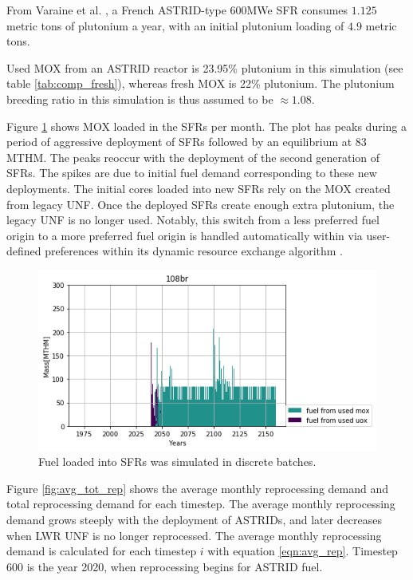 From Varaine et al. \cite{varaine_pre-conceptual_2012}, a French
ASTRID-type 600\gls{MWe} \gls{SFR} consumes $1.125$ metric tons of
plutonium a year, with an initial plutonium loading of $4.9$ metric tons.
 
Used \gls{MOX} from an ASTRID reactor is 23.95\% plutonium
in this simulation (see table \ref{tab:comp_fresh}), whereas fresh \gls{MOX} is 22\% plutonium.
The plutonium breeding ratio in this simulation is thus assumed to be
$\approx 1.08$.

Figure \ref{fig:fuel} shows \gls{MOX} loaded in the \glspl{SFR} per month.  The plot 
has peaks during a period of aggressive deployment of \glspl{SFR} followed by 
an equilibrium at 83 \gls{MTHM}. The peaks reoccur with the deployment of the 
second generation of \glspl{SFR}.  The spikes are due to initial fuel demand 
corresponding to these new deployments.  The initial cores loaded into new 
\glspl{SFR} rely on the \gls{MOX} created from legacy \gls{UNF}. Once the 
deployed \glspl{SFR} create enough extra plutonium, the legacy \gls{UNF} is no 
longer used. Notably, this switch from a less preferred fuel origin to a more 
preferred fuel origin is handled automatically within \Cyclus via user-defined preferences 
within its dynamic resource exchange algorithm \cite{gidden_methodology_2016}.


\begin{figure}[htbp!]
	\begin{center}
		\includegraphics[width=1.0\textwidth]{./images/french-transition/where_fuel.png}
	\end{center}
	\caption{Fuel loaded into \glspl{SFR} was simulated in discrete 
        batches.}
	\label{fig:fuel}
\end{figure}

Figure \ref{fig:avg_tot_rep} shows the average monthly reprocessing demand
and total reprocessing demand for each timestep. The average monthly reprocessing
demand grows steeply with the deployment of \glspl{ASTRID}, and later decreases
when \gls{LWR} \gls{UNF} is no longer reprocessed. 
The average monthly reprocessing demand is calculated for each timestep $i$
with equation \eqref{eqn:avg_rep}. Timestep 600 is the year 2020, when reprocessing
begins for \gls{ASTRID} fuel.

